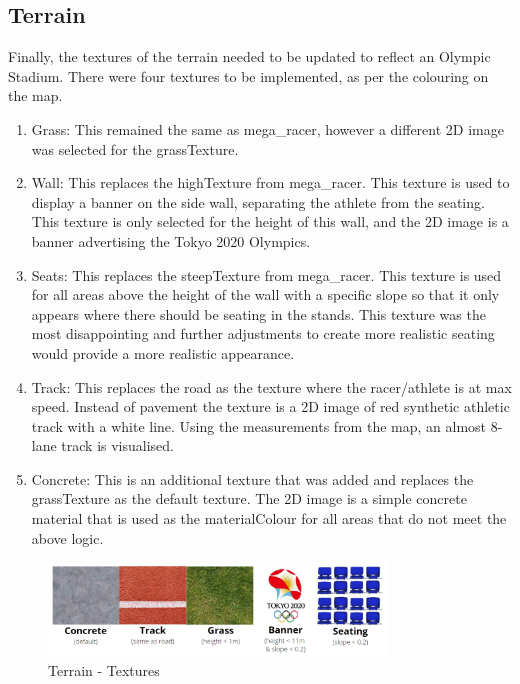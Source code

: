 \documentclass[a4 paper, 12pt]{article}
\begin{document}
\subsection{Terrain}
Finally, the textures of the terrain needed to be updated to reflect an Olympic Stadium. There were four textures to be implemented, as per the colouring on the map.
    \begin{enumerate}    
        \item Grass: This remained the same as mega\_racer, however a different 2D image was selected for the grassTexture. 
        \item Wall: This replaces the highTexture from mega\_racer. This texture is used to display a banner on the side wall, separating the athlete from the seating. This texture is only selected for the height of this wall, and the 2D image is a banner advertising the Tokyo 2020 Olympics.
        \item Seats: This replaces the steepTexture from mega\_racer. This texture is used for all areas above the height of the wall with a specific slope so that it only appears where there should be seating in the stands. This texture was the most disappointing and further adjustments to create more realistic seating would provide a more realistic appearance.
        \item Track: This replaces the road as the texture where the racer/athlete is at max speed. Instead of pavement the texture is a 2D image of red synthetic athletic track with a white line. Using the measurements from the map, an almost 8-lane track is visualised.
        \item Concrete: This is an additional texture that was added and replaces the grassTexture as the default texture. The 2D image is a simple concrete material that is used as the materialColour for all areas that do not meet the above logic.
    \end{enumerate}

    \begin{figure} [H]
        \centering
        \includegraphics[width=0.8\textwidth, frame]
            {./images/olympics/terrain_textures.PNG}  
        \caption{Terrain - Textures}   
    \end{figure}
\end{document}
